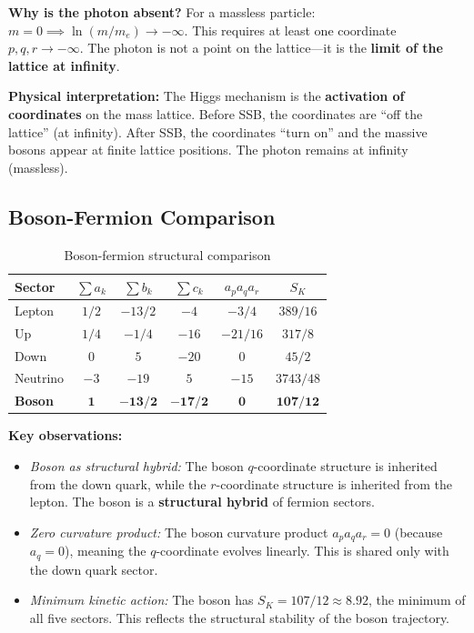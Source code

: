 \textbf{Why is the photon absent?} For a massless particle: $m = 0 \implies \ln(m/m_e) \to -\infty$. This requires at least one coordinate $p, q, r \to -\infty$. The photon is not a point on the lattice---it is the \textbf{limit of the lattice at infinity}.

\textbf{Physical interpretation:} The Higgs mechanism is the \textbf{activation of coordinates} on the mass lattice. Before SSB, the coordinates are ``off the lattice'' (at infinity). After SSB, the coordinates ``turn on'' and the massive bosons appear at finite lattice positions. The photon remains at infinity (massless).

\subsection{Boson-Fermion Comparison}\label{sec:boson_fermion_comparison}

\begin{table}[h]
\centering
\caption{Boson-fermion structural comparison}
\label{tab:boson_fermion}
\begin{tabular}{lccccc}
\hline\hline
Sector & $\sum a_k$ & $\sum b_k$ & $\sum c_k$ & $a_p a_q a_r$ & $S_K$ \\
\hline
Lepton & $1/2$ & $-13/2$ & $-4$ & $-3/4$ & $389/16$ \\
Up & $1/4$ & $-1/4$ & $-16$ & $-21/16$ & $317/8$ \\
Down & $0$ & $5$ & $-20$ & $0$ & $45/2$ \\
Neutrino & $-3$ & $-19$ & $5$ & $-15$ & $3743/48$ \\
\textbf{Boson} & $\mathbf{1}$ & $\mathbf{-13/2}$ & $\mathbf{-17/2}$ & $\mathbf{0}$ & $\mathbf{107/12}$ \\
\hline\hline
\end{tabular}
\end{table}

\textbf{Key observations:}
\begin{itemize}
\item \textit{Boson as structural hybrid:} The boson $q$-coordinate structure is inherited from the down quark, while the $r$-coordinate structure is inherited from the lepton. The boson is a \textbf{structural hybrid} of fermion sectors.
\item \textit{Zero curvature product:} The boson curvature product $a_p a_q a_r = 0$ (because $a_q = 0$), meaning the $q$-coordinate evolves linearly. This is shared only with the down quark sector.
\item \textit{Minimum kinetic action:} The boson has $S_K = 107/12 \approx 8.92$, the minimum of all five sectors. This reflects the structural stability of the boson trajectory.
\end{itemize}

